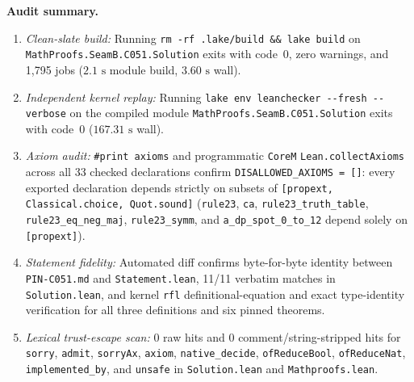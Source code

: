 \documentclass[11pt]{article}
\theoremstyle{definition}
\begin{document}
\noindent\textbf{Audit summary.}
\begin{enumerate}\setlength{\itemsep}{2pt}
\item \emph{Clean-slate build:} Running \texttt{rm -rf .lake/build \&\& lake build} on \nolinkurl{MathProofs.SeamB.C051.Solution} exits with code~$0$, zero warnings, and 1{,}795 jobs ($2.1\text{ s}$ module build, $3.60\text{ s}$ wall).
\item \emph{Independent kernel replay:} Running \texttt{lake env leanchecker -{}-fresh -{}-verbose} on the compiled module \nolinkurl{MathProofs.SeamB.C051.Solution} exits with code~$0$ ($167.31\text{ s}$ wall).
\item \emph{Axiom audit:} \texttt{\#print axioms} and programmatic \texttt{CoreM} \texttt{Lean.collectAxioms} across all 33 checked declarations confirm \texttt{DISALLOWED\_AXIOMS = []}: every exported declaration depends strictly on subsets of \texttt{[propext, Classical.choice, Quot.sound]} (\texttt{rule23}, \texttt{ca}, \texttt{rule23\_truth\_table}, \texttt{rule23\_eq\_neg\_maj}, \texttt{rule23\_symm}, and \texttt{a\_dp\_spot\_0\_to\_12} depend solely on \texttt{[propext]}).
\item \emph{Statement fidelity:} Automated diff confirms byte-for-byte identity between \texttt{PIN-C051.md} and \texttt{Statement.lean}, 11/11 verbatim matches in \texttt{Solution.lean}, and kernel \texttt{rfl} definitional-equation and exact type-identity verification for all three definitions and six pinned theorems.
\item \emph{Lexical trust-escape scan:} $0$ raw hits and $0$ comment/string-stripped hits for \texttt{sorry}, \texttt{admit}, \texttt{sorryAx}, \texttt{axiom}, \texttt{native\_decide}, \texttt{ofReduceBool}, \texttt{ofReduceNat}, \texttt{implemented\_by}, and \texttt{unsafe} in \texttt{Solution.lean} and \texttt{Mathproofs.lean}.
\end{enumerate}
\end{document}
